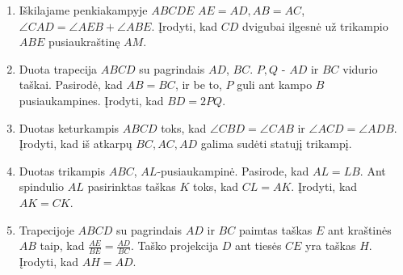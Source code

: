 \begin{enumerate}
\item Iškilajame penkiakampyje $ABCDE$ $AE = AD,AB = AC$, $\angle CAD =
  \angle AEB + \angle ABE$. Įrodyti, kad $CD$ dvigubai ilgesnė už
  trikampio $ABE$ pusiaukraštinę $AM$.
\item Duota trapecija $ABCD$ su pagrindais $AD$, $BC$.  $P,Q$ - $AD$ ir
  $BC$ vidurio taškai. Pasirodė, kad $AB = BC$, ir be to, $P$ guli ant
  kampo $B$ pusiaukampines.  Įrodyti, kad $BD = 2PQ$.
\item Duotas keturkampis $ABCD$ toks, kad $\angle CBD = \angle CAB$ ir
  $\angle ACD = \angle ADB$. Įrodyti, kad iš atkarpų $BC, AC, AD$ galima
  sudėti statujį trikampį.
\item Duotas trikampis $ABC$, $AL$-pusiaukampinė. Pasirode, kad $AL = LB$.
  Ant spindulio $AL$ pasirinktas taškas $K$ toks, kad $CL = AK$. Įrodyti,
  kad $AK = CK$.
\item Trapecijoje $ABCD$ su pagrindais $AD$ ir $BC$ paimtas taškas $E$ ant
  kraštinės $AB$ taip, kad $\frac{AE}{BE} = \frac{AD}{BC}$. Taško
  projekcija $D$ ant tiesės $CE$ yra taškas $H$. Įrodyti, kad $AH = AD$.

\end{enumerate}

